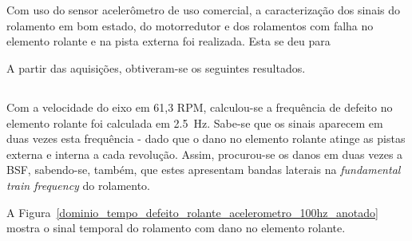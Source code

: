 \documentclass[
	12pt,				
	oneside,			
	a4paper,			
	english,			
	brazil,			
	]{abntex2ppgsi}
\begin{document}
\section{}

Com uso do sensor acelerômetro de uso comercial, a caracterização dos sinais do rolamento em bom estado, do motorredutor e dos rolamentos com falha no elemento rolante e na pista externa foi realizada. Esta se deu para

A partir das aquisições, obtiveram-se os seguintes resultados.

\subsection{}


\subsection{}


\subsection{}

Com a velocidade do eixo em 61,3 RPM, calculou-se a frequência de defeito no elemento rolante foi calculada em \SI{2,5}{\hertz}. Sabe-se que os sinais aparecem em duas vezes esta frequência - dado que o dano no elemento rolante atinge as pistas externa e interna a cada revolução. Assim, procurou-se os danos em duas vezes a BSF, sabendo-se, também, que estes apresentam bandas laterais na \textit{fundamental train frequency} do rolamento. 

A Figura~\ref{dominio_tempo_defeito_rolante_acelerometro_100hz_anotado} mostra o sinal temporal do rolamento com dano no elemento rolante.
\end{document}
